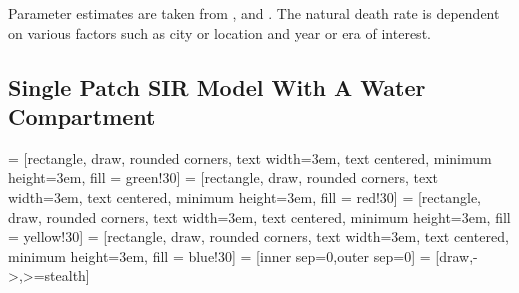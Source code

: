 \documentclass[12pt]{article}\usepackage[]{graphicx}\usepackage[]{color}
\begin{document}
Parameter estimates are taken from \cite{link5}, \cite{link8} and \cite{link3}.
The natural death rate is dependent on various factors such as city or location and year or era of interest.

\subsection{Single Patch SIR Model With A Water Compartment}

 = [rectangle, draw, rounded corners, text width=3em, text centered, minimum height=3em, fill = green!30]
 = [rectangle, draw, rounded corners, text width=3em, text centered, minimum height=3em, fill = red!30]
 = [rectangle, draw, rounded corners, text width=3em, text centered, minimum height=3em, fill = yellow!30]
 = [rectangle, draw, rounded corners, text width=3em, text centered, minimum height=3em, fill = blue!30]
 = [inner sep=0,outer sep=0]
 = [draw,->,>=stealth]
\begin{center}
\end{center}
\end{document}
